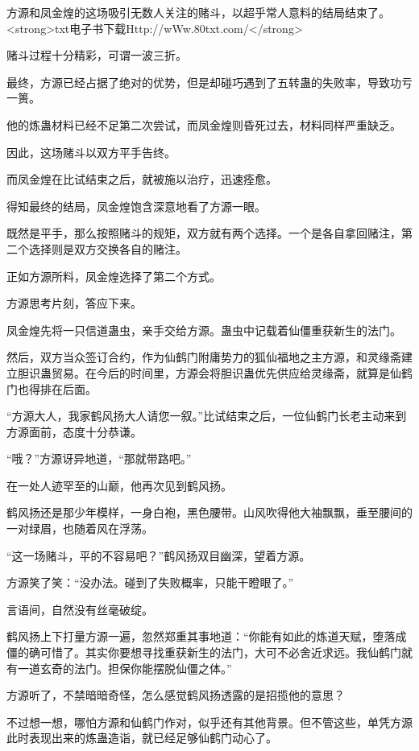 
\begin{this_body}

方源和凤金煌的这场吸引无数人关注的赌斗，以超乎常人意料的结局结束了。<strong>txt电子书下载Http://wWw.80txt.com/</strong>

赌斗过程十分精彩，可谓一波三折。

最终，方源已经占据了绝对的优势，但是却碰巧遇到了五转蛊的失败率，导致功亏一篑。

他的炼蛊材料已经不足第二次尝试，而凤金煌则昏死过去，材料同样严重缺乏。

因此，这场赌斗以双方平手告终。

而凤金煌在比试结束之后，就被施以治疗，迅速痊愈。

得知最终的结局，凤金煌饱含深意地看了方源一眼。

既然是平手，那么按照赌斗的规矩，双方就有两个选择。一个是各自拿回赌注，第二个选择则是双方交换各自的赌注。

正如方源所料，凤金煌选择了第二个方式。

方源思考片刻，答应下来。

凤金煌先将一只信道蛊虫，亲手交给方源。蛊虫中记载着仙僵重获新生的法门。

然后，双方当众签订合约，作为仙鹤门附庸势力的狐仙福地之主方源，和灵缘斋建立胆识蛊贸易。在今后的时间里，方源会将胆识蛊优先供应给灵缘斋，就算是仙鹤门也得排在后面。

“方源大人，我家鹤风扬大人请您一叙。”比试结束之后，一位仙鹤门长老主动来到方源面前，态度十分恭谦。

“哦？”方源讶异地道，“那就带路吧。”

在一处人迹罕至的山巅，他再次见到鹤风扬。

鹤风扬还是那少年模样，一身白袍，黑色腰带。山风吹得他大袖飘飘，垂至腰间的一对绿眉，也随着风在浮荡。

“这一场赌斗，平的不容易吧？”鹤风扬双目幽深，望着方源。

方源笑了笑：“没办法。碰到了失败概率，只能干瞪眼了。”

言语间，自然没有丝毫破绽。

鹤风扬上下打量方源一遍，忽然郑重其事地道：“你能有如此的炼道天赋，堕落成僵的确可惜了。其实你要想寻找重获新生的法门，大可不必舍近求远。我仙鹤门就有一道玄奇的法门。担保你能摆脱仙僵之体。”

方源听了，不禁暗暗奇怪，怎么感觉鹤风扬透露的是招揽他的意思？

不过想一想，哪怕方源和仙鹤门作对，似乎还有其他背景。但不管这些，单凭方源此时表现出来的炼蛊造诣，就已经足够仙鹤门动心了。


\end{this_body}
